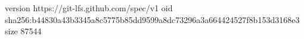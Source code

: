 version https://git-lfs.github.com/spec/v1
oid sha256:b44830a43b3345a8c5775b85dd9599a8dc73296a3a664424527f8b153d3168e3
size 87544
